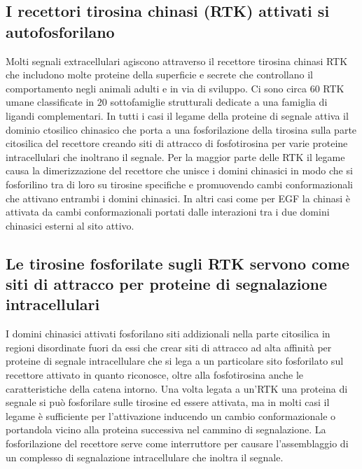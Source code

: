 \subsection{I recettori tirosina chinasi (RTK) attivati si autofosforilano}
Molti segnali extracellulari agiscono attraverso il recettore tirosina chinasi RTK che includono molte proteine della superficie e secrete che controllano il comportamento negli animali
adulti e in via di sviluppo. Ci sono circa $60$ RTK umane classificate in $20$ sottofamiglie strutturali dedicate a una famiglia di ligandi complementari. In tutti i casi il legame
della proteine di segnale attiva il dominio ctosilico chinasico che porta a una fosforilazione della tirosina sulla parte citosilica del recettore creando siti di attracco di
fosfotirosina per varie proteine intracellulari che inoltrano il segnale. Per la maggior parte delle RTK il legame causa la dimerizzazione del recettore che unisce i domini chinasici in
modo che si fosforilino tra di loro su tirosine specifiche e promuovendo cambi conformazionali che attivano entrambi i domini chinasici. In altri casi come per EGF la chinasi
\`e attivata da cambi conformazionali portati dalle interazioni tra i due domini chinasici esterni al sito attivo. 
\subsection{Le tirosine fosforilate sugli RTK servono come siti di attracco per proteine di segnalazione intracellulari}
I domini chinasici attivati fosforilano siti addizionali nella parte citosilica in regioni disordinate fuori da essi che crear siti di attracco ad alta affinit\`a per proteine di segnale
intracellulare che si lega a un particolare sito fosforilato sul recettore attivato in quanto riconosce, oltre alla fosfotirosina anche le caratteristiche della catena intorno. Una
volta legata a un'RTK una proteina di segnale si pu\`o fosforilare sulle tirosine ed essere attivata, ma in molti casi il legame \`e sufficiente per l'attivazione inducendo un
cambio conformazionale o portandola vicino alla proteina successiva nel cammino di segnalazione. La fosforilazione del recettore serve come interruttore per causare l'assemblaggio di 
un complesso di segnalazione intracellulare che inoltra il segnale. 
